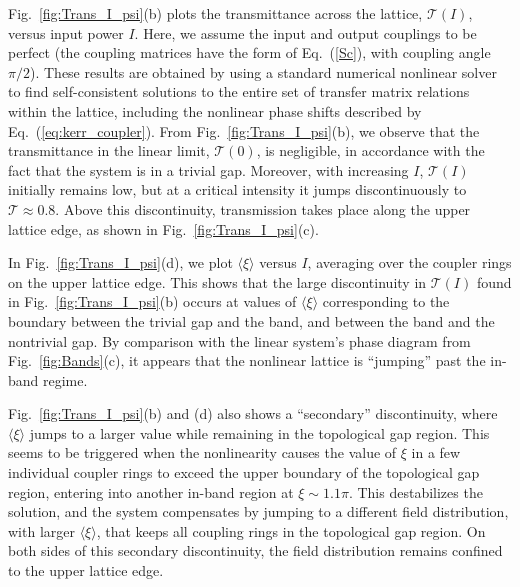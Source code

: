 \documentclass[aps,prx,twocolumn,superscriptaddress]{revtex4-1}
\begin{document}
Fig.~\ref{fig:Trans_I_psi}(b) plots the transmittance across the lattice, $\mathcal{T}(I)$, versus input power $I$.  Here, we assume the input and output couplings to be perfect (the coupling matrices have the form of Eq.~(\ref{Sc}), with coupling angle $\pi/2$).  These results are obtained by using a standard numerical nonlinear solver to find self-consistent solutions to the entire set of transfer matrix relations within the lattice, including the nonlinear phase shifts described by Eq.~(\ref{eq:kerr_coupler}).  From Fig.~\ref{fig:Trans_I_psi}(b), we observe that the transmittance in the linear limit, $\mathcal{T}(0)$, is negligible, in accordance with the fact that the system is in a trivial gap.  Moreover, with increasing $I$, $\mathcal{T}(I)$ initially remains low, but at a critical intensity it jumps discontinuously to $\mathcal{T} \approx 0.8$.  Above this discontinuity, transmission takes place along the upper lattice edge, as shown in Fig.~\ref{fig:Trans_I_psi}(c).

In Fig.~\ref{fig:Trans_I_psi}(d), we plot $\langle\xi\rangle$ versus $I$, averaging over the coupler rings on the upper lattice edge.  This shows that the large discontinuity in $\mathcal{T}(I)$ found in Fig.~\ref{fig:Trans_I_psi}(b) occurs at values of $\langle\xi\rangle$ corresponding to the boundary between the trivial gap and the band, and between the band and the nontrivial gap.  By comparison with the linear system's phase diagram from Fig.~\ref{fig:Bands}(c), it appears that the nonlinear lattice is ``jumping'' past the in-band regime.

Fig.~\ref{fig:Trans_I_psi}(b) and (d) also shows a ``secondary'' discontinuity, where $\langle\xi\rangle$ jumps to a larger value while remaining in the topological gap region.  This seems to be triggered when the nonlinearity causes the value of $\xi$ in a few individual coupler rings to exceed the upper boundary of the topological gap region, entering into another in-band region at $\xi \sim 1.1\pi$.  This destabilizes the solution, and the system compensates by jumping to a different field distribution, with larger $\langle\xi\rangle$, that keeps all coupling rings in the topological gap region.  On both sides of this secondary discontinuity, the field distribution remains confined to the upper lattice edge.
\end{document}
